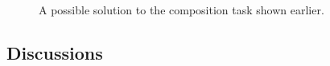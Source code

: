 \documentclass[conference]{IEEEtran}
\begin{document}
\begin{figure}
\centerline{
}
\caption{A possible solution to the composition task shown earlier.}
\label{fig:solution}
\end{figure}
\vspace{-0.3cm}
\subsection{Discussions}
\end{document}
